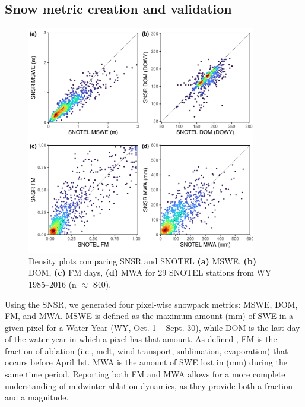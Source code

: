 
\hypertarget{ch2-methods-1}{\subsection{Snow metric creation and validation}\label{ch2-methods-1}}

\begin{figure}[t]
\centering
\includegraphics[width=10cm]{figures/ch2_figs/snsr_snotel_metric_compare_new_v1.pdf}
\caption{Density plots comparing SNSR and SNOTEL \textbf{(a)} MSWE, \textbf{(b)} DOM, \textbf{(c)} FM days, \textbf{(d)} MWA for 29 SNOTEL stations from WY 1985--2016 (n $\approx$ 840).}
\label{kuy_study_area}
\end{figure}

Using the SNSR, we generated four pixel-wise snowpack metrics: MSWE, DOM, FM, and MWA. MSWE is defined as the maximum amount (mm) of SWE in a given pixel for a Water Year (WY, Oct. 1 -- Sept. 30), while DOM is the last day of the water year in which a pixel has that amount. As defined \cite{musselmanWinterMeltTrends2021}, FM is the fraction of ablation (i.e., melt, wind transport, sublimation, evaporation) that occurs before April 1st. MWA is the amount of SWE lost in (mm) during the same time period. Reporting both FM and MWA allows for a more complete understanding of midwinter ablation dynamics, as they provide both a fraction and a magnitude.

